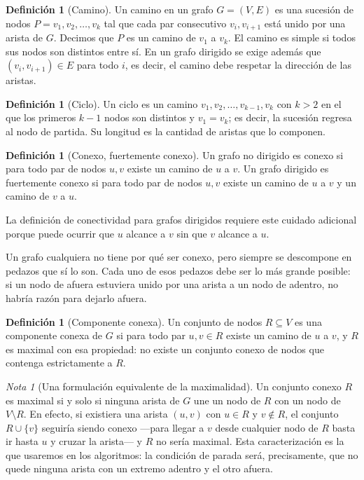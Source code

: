 \documentclass[12pt, spanish, oneside, openany]{book}
\theoremstyle{uprightplain}
\theoremstyle{definition}
\newtheorem{definicion}[teorema]{Definición}
\theoremstyle{remark}
\newtheorem{nota}[teorema]{Nota}
\theoremstyle{definition}
\begin{document}
\begin{definicion}[Camino]
\label{def:camino}
Un camino en un grafo $G=(V,E)$ es una sucesión de nodos $P=v_1,v_2,\dots,v_k$ tal que cada par consecutivo $v_i,v_{i+1}$ está unido por una arista de $G$. Decimos que $P$ es un camino de $v_1$ a $v_k$. El camino es simple si todos sus nodos son distintos entre sí. En un grafo dirigido se exige además que $(v_i,v_{i+1})\in E$ para todo $i$, es decir, el camino debe respetar la dirección de las aristas.
\end{definicion}

\begin{definicion}[Ciclo]
\label{def:ciclo}
Un ciclo es un camino $v_1,v_2,\dots,v_{k-1},v_k$ con $k>2$ en el que los primeros $k-1$ nodos son distintos y $v_1=v_k$; es decir, la sucesión regresa al nodo de partida. Su longitud es la cantidad de aristas que lo componen.
\end{definicion}

\begin{definicion}[Conexo, fuertemente conexo]
\label{def:conexo}
Un grafo no dirigido es conexo si para todo par de nodos $u,v$ existe un camino de $u$ a $v$. Un grafo dirigido es fuertemente conexo si para todo par de nodos $u,v$ existe un camino de $u$ a $v$ y un camino de $v$ a $u$.
\end{definicion}

La definición de conectividad para grafos dirigidos requiere este cuidado adicional porque puede ocurrir que $u$ alcance a $v$ sin que $v$ alcance a $u$.

Un grafo cualquiera no tiene por qué ser conexo, pero siempre se descompone en pedazos que sí lo son. Cada uno de esos pedazos debe ser lo más grande posible: si un nodo de afuera estuviera unido por una arista a un nodo de adentro, no habría razón para dejarlo afuera.

\begin{definicion}[Componente conexa]
\label{def:componente-conexa}
Un conjunto de nodos $R\subseteq V$ es una componente conexa de $G$ si para todo par $u,v\in R$ existe un camino de $u$ a $v$, y $R$ es maximal con esa propiedad: no existe un conjunto conexo de nodos que contenga estrictamente a $R$.
\end{definicion}

\begin{nota}[Una formulación equivalente de la maximalidad]
Un conjunto conexo $R$ es maximal si y solo si ninguna arista de $G$ une un nodo de $R$ con un nodo de $V\setminus R$. En efecto, si existiera una arista $(u,v)$ con $u\in R$ y $v\notin R$, el conjunto $R\cup\{v\}$ seguiría siendo conexo ---para llegar a $v$ desde cualquier nodo de $R$ basta ir hasta $u$ y cruzar la arista--- y $R$ no sería maximal. Esta caracterización es la que usaremos en los algoritmos: la condición de parada será, precisamente, que no quede ninguna arista con un extremo adentro y el otro afuera.
\end{nota}
\end{document}
